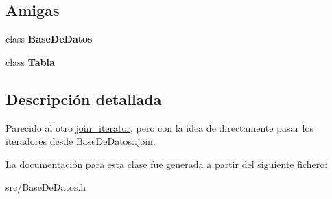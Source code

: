 \subsection*{Amigas}
\begin{DoxyCompactItemize}
\item 
\mbox{\label{classBaseDeDatos_1_1join__iterator__2_af1e840dbc460e53fa421d03b2da138e4}} 
class {\bfseries Base\+De\+Datos}
\item 
\mbox{\label{classBaseDeDatos_1_1join__iterator__2_a172484163cb8b80140c3053a4c68e4da}} 
class {\bfseries Tabla}
\end{DoxyCompactItemize}


\subsection{Descripción detallada}
Parecido al otro \mbox{\hyperlink{classBaseDeDatos_1_1join__iterator}{join\+\_\+iterator}}, pero con la idea de directamente pasar los iteradores desde Base\+De\+Datos\+::join. 

La documentación para esta clase fue generada a partir del siguiente fichero\+:\begin{DoxyCompactItemize}
\item 
src/Base\+De\+Datos.\+h\end{DoxyCompactItemize}
